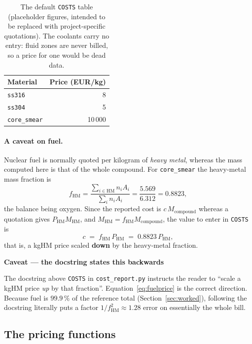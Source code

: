 \documentclass[9pt,a4paper]{extarticle}
\newcommand{\code}[1]{\texttt{\small #1}}
\newcommand{\file}[1]{\texttt{\small #1}}
\newenvironment{caveat}[1]%
  {\par\medskip\noindent
   \begin{lrbox}{\caveatbox}%
   \begin{minipage}{\dimexpr\linewidth-2\fboxsep-2\fboxrule\relax}%
   \textbf{#1}\par\medskip}%
  {\end{minipage}%
   \end{lrbox}%
   \fcolorbox{warnrule}{warnbg}{\usebox{\caveatbox}}\par\medskip}
\begin{document}
\begin{table}[h]
\centering
\footnotesize
\begin{tabular}{@{}lr@{}}
\toprule
\textbf{Material} & \textbf{Price (EUR/kg)} \\
\midrule
\code{ss316}        & 8 \\
\code{ss304}        & 5 \\
\code{core\_smear}  & 10\,000 \\
\bottomrule
\end{tabular}
\caption{The default \code{COSTS} table (placeholder figures, intended to be
replaced with project-specific quotations). The coolants carry no entry: fluid
zones are never billed, so a price for one would be dead data.}
\end{table}

\paragraph{A caveat on fuel.} Nuclear fuel is normally quoted per kilogram of
\emph{heavy metal}, whereas the mass computed here is that of the whole
compound. For \code{core\_smear} the heavy-metal mass fraction is
\begin{equation}
  f_{\mathrm{HM}}
  = \frac{\sum_{i \in \mathrm{HM}} n_i A_i}{\sum_i n_i A_i}
  = \frac{5.569}{6.312} = 0.8823 ,
\end{equation}
the balance being oxygen. Since the reported cost is $c\,M_{\text{compound}}$
whereas a quotation gives $P_{\mathrm{HM}} M_{\mathrm{HM}}$, and
$M_{\mathrm{HM}} = f_{\mathrm{HM}} M_{\text{compound}}$, the value to enter in
\code{COSTS} is
\begin{equation}
  c \;=\; f_{\mathrm{HM}}\, P_{\mathrm{HM}} \;=\; 0.8823\,P_{\mathrm{HM}} ,
  \label{eq:fuelprice}
\end{equation}
that is, a kgHM price scaled \textbf{down} by the heavy-metal fraction.

\begin{caveat}{Caveat --- the docstring states this backwards}
The docstring above \code{COSTS} in \file{cost\_report.py} instructs the reader
to ``scale a kgHM price \emph{up} by that fraction''. Equation~\eqref{eq:fuelprice}
is the correct direction. Because fuel is $99.9\,\%$ of the reference total
(Section~\ref{sec:worked}), following the docstring literally puts a factor
$1/f_{\mathrm{HM}}^2 \approx 1.28$ error on essentially the whole bill.
\end{caveat}

\subsection{The pricing functions}
\end{document}
